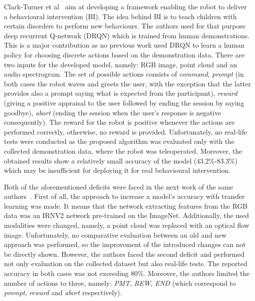 \documentclass[thesis]{mas_proposal}
\begin{document}
Clark-Turner et al~\cite{ClarkTurner2017} aim at developing a framework enabling the robot to deliver a behavioural intervention (BI). The idea behind BI is to teach children with certain disorders to perform new behaviours. The authors used for that purpose deep recurrent Q-network (DRQN) which is trained from human demonstrations. This is a major contribution as no previous work used DRQN to learn a human policy for choosing discrete actions based on the demonstration data. There are two inputs for the developed model, namely: RGB image, point cloud and an audio spectrogram. The set of possible actions consists of \emph{command}, \emph{prompt} (in both cases the robot waves and greets the user, with the exception that the latter provides also a prompt saying what is expected from the participant), \emph{reward} (giving a positive appraisal to the user followed by ending the session by saying goodbye), \emph{abort} (ending the session when the user's response is negative consequently). The reward for the robot is positive whenever the actions are performed correctly, otherwise, no reward is provided. Unfortunately, no real-life tests were conducted as the proposed algorithm was evaluated only with the collected demonstration data, where the robot was teleoperated. Moreover, the obtained results show a relatively small accuracy of the model (43.2\%-83.3\%) which may be insufficient for deploying it for real behavioural intervention.

Both of the aforementioned deficits were faced in the next work of the same authors~\cite{Turner2018}. First of all, the approach to increase a model's accuracy with transfer learning was made. It means that the network extracting features from the RGB data was an IRNV2 network pre-trained on the ImageNet. Additionally, the used modalities were changed, namely, a point cloud was replaced with an optical flow image. Unfortunately, no comparative evaluation between an old and new approach was performed, so the improvement of the introduced changes can not be directly shown. However, the authors faced the second deficit and performed not only evaluation on the collected dataset but also real-life tests. The reported accuracy in both cases was not exceeding 80\%. Moreover, the authors limited the number of actions to three, namely: \emph{PMT}, \emph{REW}, \emph{END} (which correspond to \emph{prompt}, \emph{reward} and \emph{abort} respectively).
\end{document}
